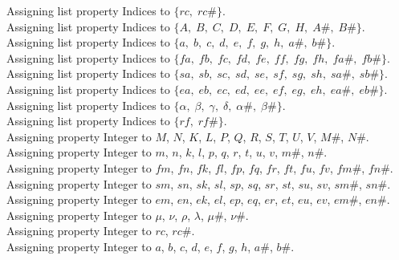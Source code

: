 \documentclass[11pt]{article}
\begin{document}
Assigning list property Indices to $\{rc,\; rc\#\}$.
\\
Assigning list property Indices to $\{A,\; B,\; C,\; D,\; E,\; F,\; G,\; H,\; A\#,\; B\#\}$.
\\
Assigning list property Indices to $\{a,\; b,\; c,\; d,\; e,\; f,\; g,\; h,\; a\#,\; b\#\}$.
\\
Assigning list property Indices to $\{fa,\; fb,\; fc,\; fd,\; fe,\; ff,\; fg,\; fh,\; fa\#,\; fb\#\}$.
\\
Assigning list property Indices to $\{sa,\; sb,\; sc,\; sd,\; se,\; sf,\; sg,\; sh,\; sa\#,\; sb\#\}$.
\\
Assigning list property Indices to $\{ea,\; eb,\; ec,\; ed,\; ee,\; ef,\; eg,\; eh,\; ea\#,\; eb\#\}$.
\\
Assigning list property Indices to $\{\alpha,\; \beta,\; \gamma,\; \delta,\; \alpha\#,\; \beta\#\}$.
\\
Assigning list property Indices to $\{rf,\; rf\#\}$.
\\
Assigning property Integer to $M$, $N$, $K$, $L$, $P$, $Q$, $R$, $S$, $T$, $U$, $V$, $M\#$, $N\#$.
\\
Assigning property Integer to $m$, $n$, $k$, $l$, $p$, $q$, $r$, $t$, $u$, $v$, $m\#$, $n\#$.
\\
Assigning property Integer to $fm$, $fn$, $fk$, $fl$, $fp$, $fq$, $fr$, $ft$, $fu$, $fv$, $fm\#$, $fn\#$.
\\
Assigning property Integer to $sm$, $sn$, $sk$, $sl$, $sp$, $sq$, $sr$, $st$, $su$, $sv$, $sm\#$, $sn\#$.
\\
Assigning property Integer to $em$, $en$, $ek$, $el$, $ep$, $eq$, $er$, $et$, $eu$, $ev$, $em\#$, $en\#$.
\\
Assigning property Integer to $\mu$, $\nu$, $\rho$, $\lambda$, $\mu\#$, $\nu\#$.
\\
Assigning property Integer to $rc$, $rc\#$.
\\
Assigning property Integer to $a$, $b$, $c$, $d$, $e$, $f$, $g$, $h$, $a\#$, $b\#$.
\end{document}

